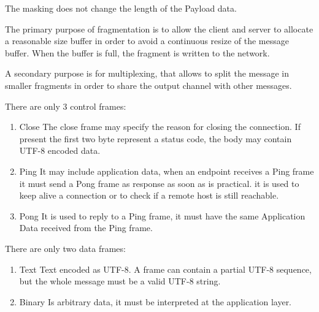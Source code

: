 
The masking does not change the length of the Payload data.\newline

The primary purpose of fragmentation is to allow the client and server to allocate a reasonable size buffer in order to avoid a continuous resize of the message buffer.\newline
When the buffer is full, the fragment is written to the network.\newline

A secondary purpose is for multiplexing, that allows to split the message in smaller fragments in order to share the output channel with other messages.\newline

There are only 3 control frames:
\begin{enumerate}
	\item Close The close frame may specify the reason for closing the connection.
	If present the first two byte represent a status code, the body may contain UTF-8 encoded data.
	\item Ping
	It may include application data, when an endpoint receives a Ping frame it must send a Pong frame as response as soon as is practical.
	it is used to keep alive a connection or to check if a remote host is still reachable.
	\item Pong
	It is used to reply to a Ping frame, it must have the same Application Data received from the Ping frame.
\end{enumerate}

There are only two data frames:
\begin{enumerate}
	\item Text
	Text encoded as UTF-8.
	A frame can contain a partial UTF-8 sequence, but the whole message must be a valid UTF-8 string.
	\item Binary
	Is arbitrary data, it must be interpreted at the application layer.
\end{enumerate}

